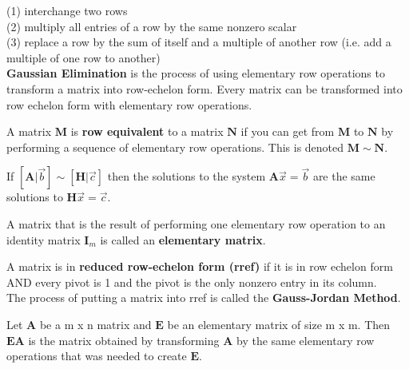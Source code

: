 \documentclass{article}
\begin{document}
    \begin{definition}
    
    (1) interchange two rows\\
    (2) multiply all entries of a row by the same nonzero scalar \\
    (3) replace a row by the sum of itself and a multiple of another row (i.e. add a multiple of one row to another) \\
    
    \textbf{Gaussian Elimination} is the process of using elementary row operations to transform a matrix into row-echelon form. Every matrix can be transformed into row echelon form with elementary row operations. 
    \end{definition}
    
    \begin{definition} 
    A matrix $\boldsymbol{M}$ is \textbf{row equivalent} to a matrix $\boldsymbol{N}$ if you can get from $\boldsymbol{M}$ to $\boldsymbol{N}$ by performing a sequence of elementary row operations. This is denoted $\boldsymbol{M} \sim \boldsymbol{N}.$
    \end{definition}
    
    \begin{theorem}
    If $[\boldsymbol{A} | \vec{b}] \sim [\boldsymbol{H} | \vec{c}]$ then the solutions to the system $\boldsymbol{A}\vec{x} = \vec{b}$ are the same solutions to $\boldsymbol{H}\vec{x} = \vec{c}.$
    \end{theorem}
    
    \begin{definition}
    A matrix that is the result of performing one elementary row operation to an identity matrix $\boldsymbol{I}_m$ is called an \textbf{elementary matrix}.
    \end{definition}
    
    \begin{definition}
    A matrix is in \textbf{reduced row-echelon form (rref)} if it is in row echelon form AND every pivot is 1 and the pivot is the only nonzero entry in its column. \\
    
    The process of putting a matrix into rref is called the \textbf{Gauss-Jordan Method}.
    \end{definition}
    
    \begin{theorem}
    Let $\boldsymbol{A}$ be a m x n matrix and $\boldsymbol{E}$ be an elementary matrix of size m x m. Then $\boldsymbol{EA}$ is the matrix obtained by transforming $\boldsymbol{A}$ by the same elementary row operations that was needed to create $\boldsymbol{E}.$ 
    \end{theorem}
    
\end{document}
